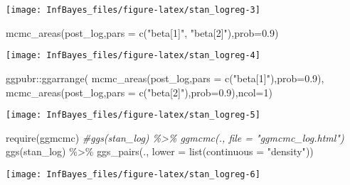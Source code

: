 \documentclass[
]{book}
\newenvironment{Shaded}{\begin{snugshade}}{\end{snugshade}}
\newcommand{\AttributeTok}[1]{\textcolor[rgb]{0.77,0.63,0.00}{#1}}
\newcommand{\CommentTok}[1]{\textcolor[rgb]{0.56,0.35,0.01}{\textit{#1}}}
\newcommand{\DecValTok}[1]{\textcolor[rgb]{0.00,0.00,0.81}{#1}}
\newcommand{\FloatTok}[1]{\textcolor[rgb]{0.00,0.00,0.81}{#1}}
\newcommand{\FunctionTok}[1]{\textcolor[rgb]{0.00,0.00,0.00}{#1}}
\newcommand{\NormalTok}[1]{#1}
\newcommand{\SpecialCharTok}[1]{\textcolor[rgb]{0.00,0.00,0.00}{#1}}
\newcommand{\StringTok}[1]{\textcolor[rgb]{0.31,0.60,0.02}{#1}}
\begin{document}
\begin{center}\texttt{[image: InfBayes\_files/figure-latex/stan\_logreg-3]} \end{center}

\begin{Shaded}
\begin{Highlighting}[]
\FunctionTok{mcmc\_areas}\NormalTok{(post\_log,}\AttributeTok{pars =} \FunctionTok{c}\NormalTok{(}\StringTok{"beta[1]"}\NormalTok{, }\StringTok{"beta[2]"}\NormalTok{),}\AttributeTok{prob=}\FloatTok{0.9}\NormalTok{)}
\end{Highlighting}
\end{Shaded}

\begin{center}\texttt{[image: InfBayes\_files/figure-latex/stan\_logreg-4]} \end{center}

\begin{Shaded}
\begin{Highlighting}[]
\NormalTok{ggpubr}\SpecialCharTok{::}\FunctionTok{ggarrange}\NormalTok{(}
  \FunctionTok{mcmc\_areas}\NormalTok{(post\_log,}\AttributeTok{pars =} \FunctionTok{c}\NormalTok{(}\StringTok{"beta[1]"}\NormalTok{),}\AttributeTok{prob=}\FloatTok{0.9}\NormalTok{),}
  \FunctionTok{mcmc\_areas}\NormalTok{(post\_log,}\AttributeTok{pars =} \FunctionTok{c}\NormalTok{(}\StringTok{"beta[2]"}\NormalTok{),}\AttributeTok{prob=}\FloatTok{0.9}\NormalTok{),}\AttributeTok{ncol=}\DecValTok{1}\NormalTok{)}
\end{Highlighting}
\end{Shaded}

\begin{center}\texttt{[image: InfBayes\_files/figure-latex/stan\_logreg-5]} \end{center}

\begin{Shaded}
\begin{Highlighting}[]
\FunctionTok{require}\NormalTok{(ggmcmc)}
\CommentTok{\#ggs(stan\_log) \%\textgreater{}\% ggmcmc(., file = "ggmcmc\_log.html")}
\FunctionTok{ggs}\NormalTok{(stan\_log) }\SpecialCharTok{\%\textgreater{}\%} \FunctionTok{ggs\_pairs}\NormalTok{(., }\AttributeTok{lower =} \FunctionTok{list}\NormalTok{(}\AttributeTok{continuous =} \StringTok{"density"}\NormalTok{))}
\end{Highlighting}
\end{Shaded}

\begin{center}\texttt{[image: InfBayes\_files/figure-latex/stan\_logreg-6]} \end{center}
\end{document}
